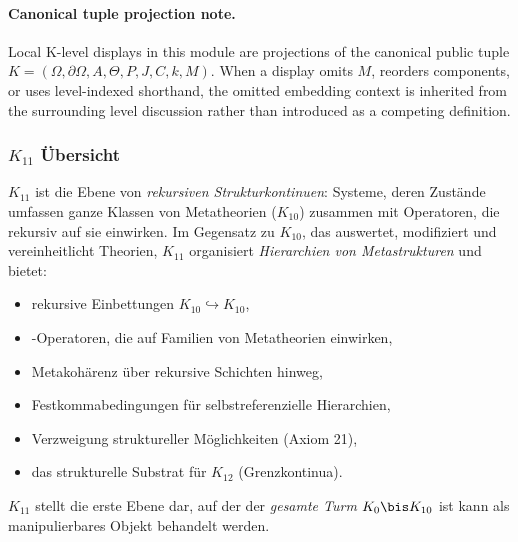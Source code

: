 



\paragraph{Canonical tuple projection note.}
Local K-level displays in this module are projections of the canonical public tuple \(K=(\Omega,\partial\Omega,A,\Theta,P,J,C,k,M)\). When a display omits \(M\), reorders components, or uses level-indexed shorthand, the omitted embedding context is inherited from the surrounding level discussion rather than introduced as a competing definition.

\subsubsection{$K_{11}$ Übersicht}
\label{sec:k11-overview}

$K_{11}$ ist die Ebene von \emph{rekursiven Strukturkontinuen}: Systeme, deren
Zustände umfassen ganze Klassen von Metatheorien ($K_{10}$) zusammen mit
Operatoren, die rekursiv auf sie einwirken. Im Gegensatz zu $K_{10}$, das auswertet,
modifiziert und vereinheitlicht Theorien, $K_{11}$ organisiert \emph{Hierarchien von
Metastrukturen} und bietet:
\begin{itemize}
    \item rekursive Einbettungen $K_{10}\hookrightarrow K_{10}$,
    \item-Operatoren, die auf Familien von Metatheorien einwirken,
    \item Metakohärenz über rekursive Schichten hinweg,
    \item Festkommabedingungen für selbstreferenzielle Hierarchien,
    \item Verzweigung struktureller Möglichkeiten (Axiom 21),
    \item das strukturelle Substrat für $K_{12}$ (Grenzkontinua).
\end{itemize}

$K_{11}$ stellt die erste Ebene dar, auf der der \emph{gesamte Turm} $K_0 \bis K_{10}$ ist
kann als manipulierbares Objekt behandelt werden.

